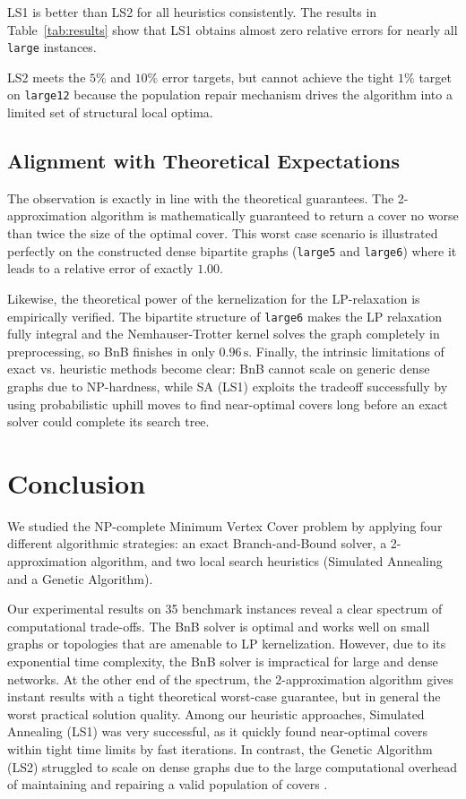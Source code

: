 \documentclass[sigconf]{acmart}
\begin{document}
LS1 is better than LS2 for all heuristics consistently. The results in Table~\ref{tab:results} show that LS1 obtains almost zero relative errors for nearly all \texttt{large} instances.

LS2 meets the $5\%$ and $10\%$ error targets, but cannot achieve the tight $1\%$ target on \texttt{large12} because the population repair mechanism drives the algorithm into a limited set of structural local optima.

\subsection{Alignment with Theoretical Expectations}
The observation is exactly in line with the theoretical guarantees. The 2-approximation algorithm is mathematically guaranteed to return a cover no worse than twice the size of the optimal cover. This worst case scenario is illustrated perfectly on the constructed dense bipartite graphs (\texttt{large5} and \texttt{large6}) where it leads to a relative error of exactly $1.00$.

Likewise, the theoretical power of the kernelization for the LP-relaxation is empirically verified. The bipartite structure of \texttt{large6} makes the LP relaxation fully integral and the Nemhauser-Trotter kernel solves the graph completely in preprocessing, so BnB finishes in only $0.96\,\text{s}$. Finally, the intrinsic limitations of exact vs. heuristic methods become clear: BnB cannot scale on generic dense graphs due to NP-hardness, while SA (LS1) exploits the tradeoff successfully by using probabilistic uphill moves to find near-optimal covers long before an exact solver could complete its search tree.


\section{Conclusion}
\label{sec:conclusion}
We studied the NP-complete Minimum Vertex Cover problem by applying four different algorithmic strategies: an exact Branch-and-Bound solver, a 2-approximation algorithm, and two local search heuristics (Simulated Annealing and a Genetic Algorithm).

Our experimental results on 35 benchmark instances reveal a clear spectrum of computational trade-offs. The BnB solver is optimal and works well on small graphs or topologies that are amenable to LP kernelization. However, due to its exponential time complexity, the BnB solver is impractical for large and dense networks. At the other end of the spectrum, the 2-approximation algorithm gives instant results with a tight theoretical worst-case guarantee, but in general the worst practical solution quality. Among our heuristic approaches, Simulated Annealing (LS1) was very successful, as it quickly found near-optimal covers within tight time limits by fast iterations. In contrast, the Genetic Algorithm (LS2) struggled to scale on dense graphs due to the large computational overhead of maintaining and repairing a valid population of covers .
\end{document}

